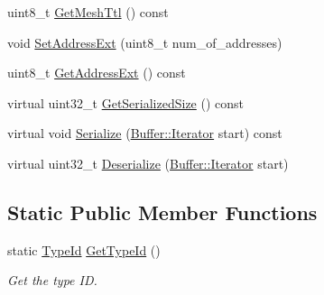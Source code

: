 \begin{DoxyCompactItemize}
\item 
uint8\+\_\+t \hyperlink{classns3_1_1dot11s_1_1MeshHeader_a6bdcea8d8dca81e7bee92cd198fdf3a9}{Get\+Mesh\+Ttl} () const 
\item 
void \hyperlink{classns3_1_1dot11s_1_1MeshHeader_aa1620c61386f3bb4601e3250a25bab3f}{Set\+Address\+Ext} (uint8\+\_\+t num\+\_\+of\+\_\+addresses)
\item 
uint8\+\_\+t \hyperlink{classns3_1_1dot11s_1_1MeshHeader_a9fe30a410b9e2ecb8102b409b62fda75}{Get\+Address\+Ext} () const 
\item 
virtual uint32\+\_\+t \hyperlink{classns3_1_1dot11s_1_1MeshHeader_ae97f67d134943e4d9cf35a392bdbf252}{Get\+Serialized\+Size} () const 
\item 
virtual void \hyperlink{classns3_1_1dot11s_1_1MeshHeader_a178130c3beaa1a945eb9ee17b321c894}{Serialize} (\hyperlink{classns3_1_1Buffer_1_1Iterator}{Buffer\+::\+Iterator} start) const 
\item 
virtual uint32\+\_\+t \hyperlink{classns3_1_1dot11s_1_1MeshHeader_ae1d5bb8426d5bb59885db11f699f436c}{Deserialize} (\hyperlink{classns3_1_1Buffer_1_1Iterator}{Buffer\+::\+Iterator} start)
\end{DoxyCompactItemize}
\subsection*{Static Public Member Functions}
\begin{DoxyCompactItemize}
\item 
static \hyperlink{classns3_1_1TypeId}{Type\+Id} \hyperlink{classns3_1_1dot11s_1_1MeshHeader_a62d8b7921b3fea8ffc897880901f480e}{Get\+Type\+Id} ()
\begin{DoxyCompactList}\small\item\em Get the type ID. \end{DoxyCompactList}\end{DoxyCompactItemize}
